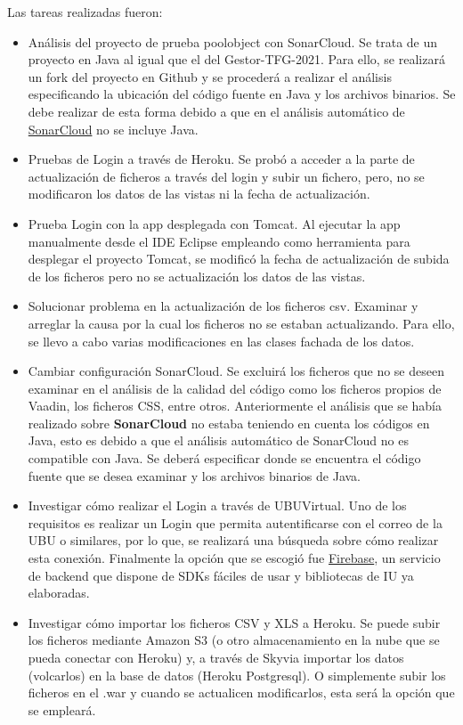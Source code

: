 Las tareas realizadas fueron:
\begin{itemize}
	\tightlist
	\item Análisis del proyecto de prueba poolobject con SonarCloud.
		Se trata de un proyecto en Java al igual que el del Gestor-TFG-2021. Para ello, se realizará un fork del proyecto en Github y se procederá a realizar el análisis especificando la ubicación del código fuente en Java y los archivos binarios. Se debe realizar de esta forma debido a que en el análisis automático de \href{https://sonarcloud.io/}{SonarCloud} no se incluye Java.
	\item Pruebas de Login a través de Heroku. 
		Se probó a acceder a la parte de actualización de ficheros a través del login y subir un fichero, pero, no se modificaron los datos de las vistas ni la fecha de actualización.
	\item Prueba Login con la app desplegada con Tomcat. 
		Al ejecutar la app manualmente desde el IDE Eclipse empleando como herramienta para desplegar el proyecto Tomcat, se modificó la fecha de actualización de subida de los ficheros pero no se actualización los datos de las vistas.
	\item Solucionar problema en la actualización de los ficheros csv.
		 Examinar y arreglar la causa por la cual los ficheros no se estaban actualizando. Para ello, se llevo a cabo varias modificaciones en las clases fachada de los datos.
	\item Cambiar configuración SonarCloud. 
		Se excluirá los ficheros que no se deseen examinar en el análisis de la calidad del código como los ficheros propios de Vaadin, los ficheros CSS, entre otros. Anteriormente el análisis que se había realizado sobre \textbf{SonarCloud} no estaba teniendo en cuenta los códigos en Java, esto es debido a que el análisis automático de SonarCloud no es compatible con Java. Se deberá especificar donde se encuentra el código fuente que se desea examinar y los archivos binarios de Java.
	\item Investigar cómo realizar el Login a través de UBUVirtual. 
		Uno de los requisitos es realizar un Login que permita autentificarse con el correo de la UBU o similares, por lo que, se realizará una búsqueda sobre cómo realizar esta conexión. Finalmente la opción que se escogió fue \href{https://firebase.google.com/}{Firebase}, un servicio de backend que dispone de SDKs fáciles de usar y bibliotecas de IU ya elaboradas.
	\item Investigar cómo importar los ficheros CSV y XLS a Heroku.
		Se puede subir los ficheros mediante Amazon S3 (o otro almacenamiento en la nube que se pueda conectar con Heroku) y, a través de Skyvia importar los datos (volcarlos) en la base de datos (Heroku Postgresql). O simplemente subir los ficheros en el .war y cuando se actualicen modificarlos, esta será la opción que se empleará.

\end{itemize}
